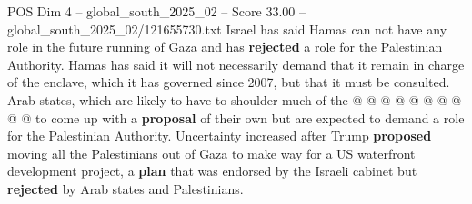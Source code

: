 \begin{textsample}{POS Dim 4 – global\_south\_2025\_02 – Score 33.00 – global\_south\_2025\_02/121655730.txt}
Israel has said Hamas can not have any role in the future running of Gaza and has \textbf{rejected} a role for the Palestinian Authority.
Hamas has said it will not necessarily demand that it remain in charge of the enclave, which it has governed since 2007, but that it must be consulted.
Arab states, which are likely to have to shoulder much of the @ @ @ @ @ @ @ @ @ @ to come up with a \textbf{proposal} of their own but are expected to demand a role for the Palestinian Authority.
Uncertainty increased after Trump \textbf{proposed} moving all the Palestinians out of Gaza to make way for a US waterfront development project, a \textbf{plan} that was endorsed by the Israeli cabinet but \textbf{rejected} by Arab states and Palestinians.

\end{textsample}
